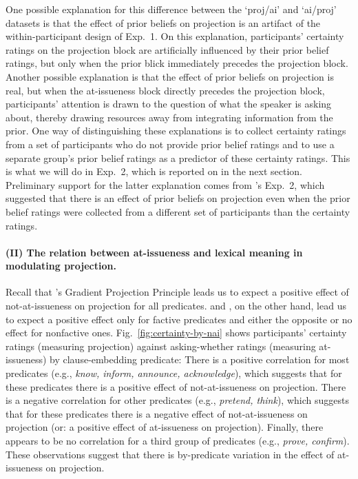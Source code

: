 \documentclass[11pt,fleqn]{article}
\newcommand{\6}{\mbox{$[\hspace*{-.6mm}[$}}
\newcommand{\9}{\mbox{$]\hspace*{-.6mm}]$}}
\newcommand{\citepos}[1]{\citeauthor{#1}'s \citeyear{#1}}
\begin{document}
One possible explanation for this difference between the `proj/ai' and `ai/proj' datasets is that the effect of prior beliefs on projection is an artifact of the within-participant design of Exp.~1. On this explanation, participants' certainty ratings on the projection block are artificially influenced by their prior belief ratings, but only when the prior blick immediately precedes the projection block. Another possible explanation is that the effect of prior beliefs on projection is real, but when the at-issueness block directly precedes the projection block, participants' attention is drawn to the question of what the speaker is asking about, thereby drawing resources away from integrating information from the prior. One way of distinguishing these explanations is to collect certainty ratings from a set of participants who do not provide prior belief ratings and to use a separate group's prior belief ratings as a predictor of these certainty ratings. This is what we will do in Exp.~2, which is reported on in the next section. Preliminary support for the latter explanation comes from \citepos{degen-tonhauser-openmind} Exp.~2, which suggested that there is an effect of prior beliefs on projection even when the prior belief ratings were collected from a different set of participants than the certainty ratings.
                          
\paragraph{(II) The relation between at-issueness and lexical meaning in modulating projection.} Recall that \citepos{tbd-variability} Gradient Projection Principle leads us to expect a positive effect of not-at-issueness on projection for all predicates. \citealt{djaerv-bacovcin-salt27,djaerv-bacovcin2020} and \citealt{mahler-etal2020}, on the other hand, lead us to expect a positive effect only for factive predicates and either the opposite or no effect for nonfactive ones. Fig.~\ref{fig:certainty-by-nai} shows participants' certainty ratings (measuring projection) against asking-whether ratings (measuring at-issueness) by clause-embedding predicate: There is a positive correlation for most predicates (e.g., {\em know, inform, announce, acknowledge}), which suggests that for these predicates there is a positive effect of not-at-issueness on projection. There is a negative correlation for other predicates (e.g., {\em pretend, think}), which suggests that for these predicates there is a negative effect of not-at-issueness on projection (or: a positive effect of at-issueness on projection). Finally, there appears to be no correlation for a third group of predicates (e.g., {\em prove, confirm}). These observations suggest that there is by-predicate variation in the effect of at-issueness on projection.
\end{document}
